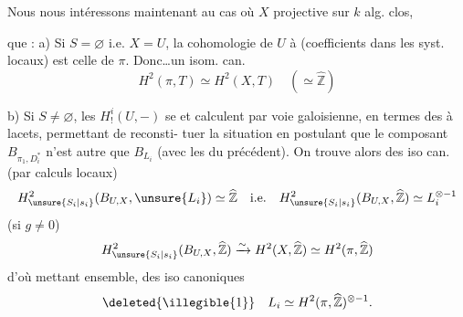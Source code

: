 Nous nous intéressons maintenant au
cas où $X$ projective  sur $k$ alg. clos, 

que : 
a) Si $S=\varnothing$ i.e. $X=U$, la cohomologie de $U$
à (coefficients dans les syst. locaux) est celle
de $\pi$. Donc\ldots un isom. can.
\[
H^2(\pi,T)\simeq H^2(X,T)\quad(\simeq\widehat{\mathbb Z})
\]

b) Si $S\ne\varnothing$, les $H^i_!(U,-)$ se 
et calculent par voie galoisienne, en termes
des   à lacets, permettant de reconsti-
tuer la situation
en postulant que le composant $B_{\pi_1,D_i^{*}}$
n'est autre que $B_{L_i}$ (avec les
 du  précédent). On
trouve alors des iso can. (par calculs locaux)
\[
H^2_{\unsure{S_i|s_i}}(B_{U,X},\unsure{L_i})\simeq\widehat{\mathbb Z}
\quad\text{i.e.}\quad
H^2_{\unsure{S_i|s_i}}(B_{U,X},\widehat{\mathbb Z})\simeq L_i^{\otimes-1}
\]
(si $g\ne0$)
\[
H^2_{\unsure{S_i|s_i}}(B_{U,X},\widehat{\mathbb Z})
\xrightarrow{\sim}H^2(X,\widehat{\mathbb Z})
\simeq H^2(\pi,\widehat{\mathbb Z})
\]
d'où   mettant ensemble, des iso
canoniques
\[
\deleted{\illegible{1}}\quad L_i\simeq H^2(\pi,\widehat{\mathbb Z})^{\otimes-1}.
\]
